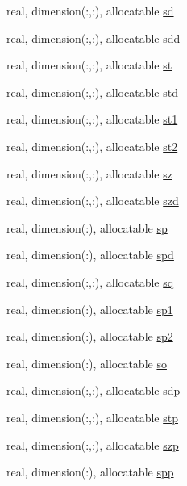 \begin{DoxyCompactItemize}
real, dimension(\-:,\-:), allocatable \hyperlink{classpumamod_a607c73cd3e6556d8dfa4337bb71bad61}{sd}
\item 
real, dimension(\-:,\-:), allocatable \hyperlink{classpumamod_a4ec415d0ab8671b481436b79bc708c4d}{sdd}
\item 
real, dimension(\-:,\-:), allocatable \hyperlink{classpumamod_a9e5f2e6b01b35c141b673be058d6ba52}{st}
\item 
real, dimension(\-:,\-:), allocatable \hyperlink{classpumamod_ac4bf8bb0f46d1d2f91f95e10be02a738}{std}
\item 
real, dimension(\-:,\-:), allocatable \hyperlink{classpumamod_aad136f237f5ca5d94b6f0e0e742864df}{st1}
\item 
real, dimension(\-:,\-:), allocatable \hyperlink{classpumamod_a69fc3701590281746d17dcb2f80c1c03}{st2}
\item 
real, dimension(\-:,\-:), allocatable \hyperlink{classpumamod_a6da929d3d47a0b47afc30657bf43cb74}{sz}
\item 
real, dimension(\-:,\-:), allocatable \hyperlink{classpumamod_a2de620590b09238085f6a8c4810c4392}{szd}
\item 
real, dimension(\-:), allocatable \hyperlink{classpumamod_a62dbb101d0fe728fa2231fa3482ee7b1}{sp}
\item 
real, dimension(\-:), allocatable \hyperlink{classpumamod_a99ec3c13cdd619b700160372a330f531}{spd}
\item 
real, dimension(\-:,\-:), allocatable \hyperlink{classpumamod_a02a75a47225d636193b203a0d7ccc4ee}{sq}
\item 
real, dimension(\-:), allocatable \hyperlink{classpumamod_a8509c5063893002e614541f3f546db2f}{sp1}
\item 
real, dimension(\-:), allocatable \hyperlink{classpumamod_ac0a89b4b892f00ce4069b1adc76ac1ad}{sp2}
\item 
real, dimension(\-:), allocatable \hyperlink{classpumamod_ab0c826a52384cc9195a2244e7003cab8}{so}
\item 
real, dimension(\-:,\-:), allocatable \hyperlink{classpumamod_aa56f906a0a8233f5a59a2dd2375d7bfe}{sdp}
\item 
real, dimension(\-:,\-:), allocatable \hyperlink{classpumamod_aad8ec9e8e440a8a077624b05430d1d65}{stp}
\item 
real, dimension(\-:,\-:), allocatable \hyperlink{classpumamod_a1d691f7ffd430d06377c953ac7b1615a}{szp}
\item 
real, dimension(\-:), allocatable \hyperlink{classpumamod_a8c0d3d0d8eaeee34966b2ed8cdab6880}{spp}

\end{DoxyCompactItemize}

